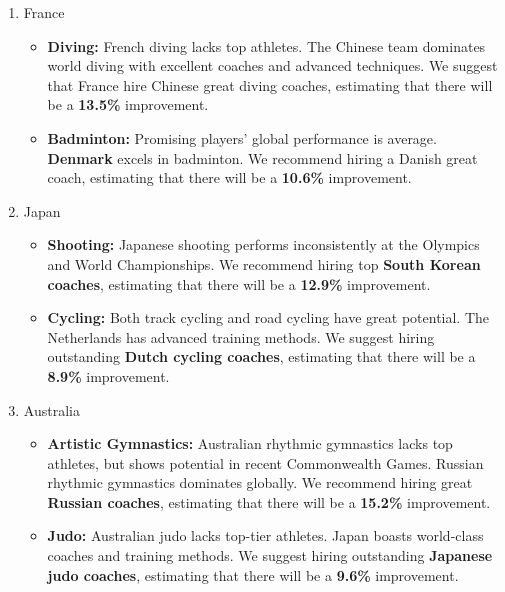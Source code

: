 \documentclass{mcmthesis}
\begin{document}
\begin{enumerate}[leftmargin=0.15in, labelsep=0.1in, itemsep=1pt, parsep=0pt]
	\item France
	\begin{itemize}[leftmargin=0.15in, labelsep=0.1in, itemsep=1pt, parsep=0pt]
		\item \textbf{Diving: } 
		French diving lacks top athletes. The Chinese team dominates world diving with excellent coaches and advanced techniques. We suggest that France hire Chinese great diving coaches, estimating that there will be a \textbf{13.5\%} improvement.
		\item \textbf{Badminton: }
		Promising players' global performance is average. \textbf{Denmark} excels in badminton. We recommend hiring a Danish great coach, estimating that there will be a \textbf{10.6\%} improvement.
	\end{itemize}
	
	\item Japan
	\begin{itemize}[leftmargin=0.15in, labelsep=0.1in, itemsep=1pt, parsep=0pt]
		\item \textbf{Shooting: }
		Japanese shooting performs inconsistently at the Olympics and World Championships. We recommend hiring top \textbf{South Korean coaches}, estimating that there will be a \textbf{12.9\%} improvement.
		\item \textbf{Cycling: }
		Both track cycling and road cycling have great potential. The Netherlands has advanced training methods. We suggest hiring outstanding \textbf{Dutch cycling coaches}, estimating that there will be a \textbf{8.9\%} improvement.
	\end{itemize}
	
	\item Australia
	\begin{itemize}[leftmargin=0.15in, labelsep=0.1in, itemsep=1pt, parsep=0pt]
		\item \textbf{Artistic Gymnastics: }
		Australian rhythmic gymnastics lacks top athletes, but shows potential in recent Commonwealth Games. Russian rhythmic gymnastics dominates globally. We recommend hiring great \textbf{Russian coaches}, estimating that there will be a \textbf{15.2\%} improvement.
		\item \textbf{Judo: }
		Australian judo lacks top-tier athletes. Japan boasts world-class coaches and training methods. We suggest hiring outstanding \textbf{Japanese judo coaches}, estimating that there will be a \textbf{9.6\%} improvement.
	\end{itemize}
	
\end{enumerate}
\end{document}
